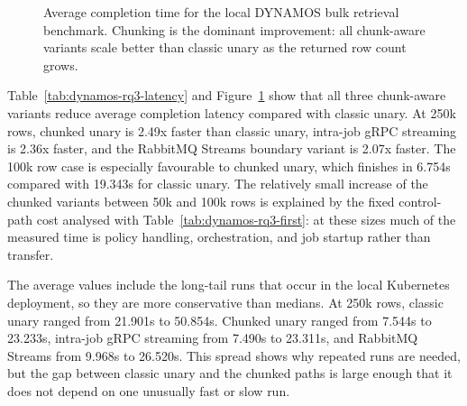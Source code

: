 \begin{figure}[!htbp]
    \centering
    \caption{Average completion time for the local DYNAMOS bulk retrieval benchmark. Chunking is the dominant improvement: all chunk-aware variants scale better than classic unary as the returned row count grows.}
    \label{fig:dynamos-rq3-latency}
\end{figure}

Table~\ref{tab:dynamos-rq3-latency} and Figure~\ref{fig:dynamos-rq3-latency} show that all three chunk-aware variants reduce average completion latency compared with classic unary. At 250k rows, chunked unary is 2.49x faster than classic unary, intra-job gRPC streaming is 2.36x faster, and the RabbitMQ Streams boundary variant is 2.07x faster. The 100k row case is especially favourable to chunked unary, which finishes in 6.754s compared with 19.343s for classic unary. The relatively small increase of the chunked variants between 50k and 100k rows is explained by the fixed control-path cost analysed with Table~\ref{tab:dynamos-rq3-first}: at these sizes much of the measured time is policy handling, orchestration, and job startup rather than transfer.

The average values include the long-tail runs that occur in the local Kubernetes deployment, so they are more conservative than medians. At 250k rows, classic unary ranged from 21.901s to 50.854s. Chunked unary ranged from 7.544s to 23.233s, intra-job gRPC streaming from 7.490s to 23.311s, and RabbitMQ Streams from 9.968s to 26.520s. This spread shows why repeated runs are needed, but the gap between classic unary and the chunked paths is large enough that it does not depend on one unusually fast or slow run.

